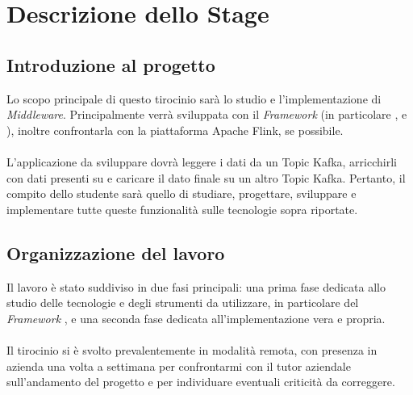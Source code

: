 \chapter{Descrizione dello Stage}

\section{Introduzione al progetto}
Lo scopo principale di questo tirocinio sarà lo studio e l'implementazione di \textit{Middleware}. Principalmente verrà sviluppata con il \textit{\gls{Framework}}  (in particolare ,  e ), inoltre confrontarla con la piattaforma Apache Flink, se possibile. \\ \\
L'applicazione da sviluppare dovrà leggere i dati da un \gls{Topic Kafka}, arricchirli con dati presenti su  e caricare il dato finale su un altro \gls{Topic Kafka}.
Pertanto, il compito dello studente sarà quello di studiare, progettare, sviluppare e implementare tutte queste funzionalità sulle tecnologie sopra riportate.

\section{Organizzazione del lavoro}
Il lavoro è stato suddiviso in due fasi principali: una prima fase dedicata allo studio delle tecnologie e degli strumenti da utilizzare, in particolare del \textit{\gls{Framework}} , e una seconda fase dedicata all'implementazione vera e propria. \\ \\
Il tirocinio si è svolto prevalentemente in modalità remota, con presenza in azienda una volta a settimana per confrontarmi con il tutor aziendale sull'andamento del progetto e per individuare eventuali criticità da correggere.

\newpage
